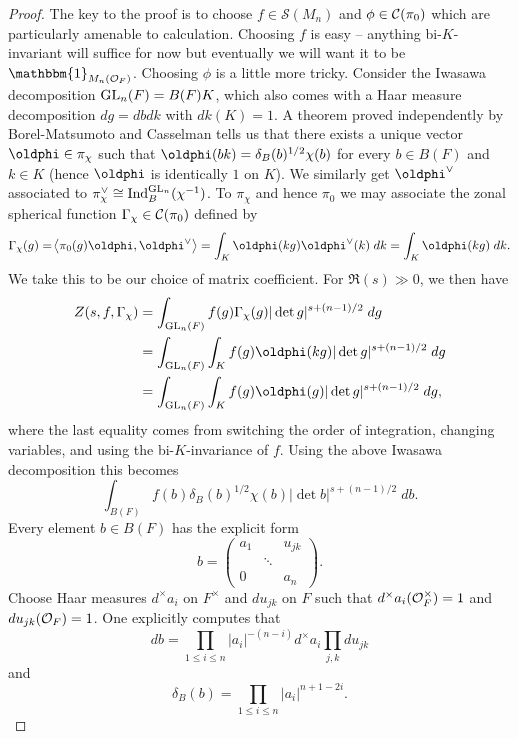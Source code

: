 \documentclass[11pt]{article}
\newcommand{\Ind}{\textup{Ind}} %
\newcommand{\ind}{\mathbbm{1}}
\renewcommand{\S}{\mathscr{S}}
\begin{document}
\begin{proof}
The key to the proof is to choose $f\in\S(M_n)$ and $\phi\in\mathcal{C}(\pi_0)$ which are particularly amenable to calculation. Choosing $f$ is easy -- anything bi-$K$-invariant will suffice for now but eventually we will want it to be $\ind_{M_n(\O_F)}$. Choosing $\phi$ is a little more tricky. Consider the Iwasawa decomposition $\textup{GL}_n(F)=B(F)K$, which also comes with a Haar measure decomposition $dg=dbdk$ with $dk(K)=1$. A theorem proved independently by Borel-Matsumoto and Casselman tells us that there exists a unique vector $\oldphi\in\pi_{\chi}$ such that $\oldphi(bk)=\delta_B(b)^{1/2}\chi(b)$ for every $b\in B(F)$ and $k\in K$ (hence $\oldphi$ is identically $1$ on $K$). We similarly get $\oldphi^{\vee}$ associated to $\pi_{\chi}^{\vee}\iso\Ind_B^{\GL_n}(\chi^{-1})$. To $\pi_{\chi}$ and hence $\pi_0$ we may associate the zonal spherical function $\Gamma_{\chi}\in\mathcal{C}(\pi_0)$ defined by 
\begin{align*}
\Gamma_{\chi}(g)
=\ip{\pi_0(g)\oldphi,\oldphi^{\vee}}
=\int_K\oldphi(kg)\oldphi^{\vee}(k)\;dk
=\int_K\oldphi(kg)\;dk.
\end{align*}
We take this to be our choice of matrix coefficient. For $\Re(s)\gg0$, we then have
\begin{align*}
Z(s,f,\Gamma_{\chi})
&=\int_{\GL_n(F)}f(g)\Gamma_{\chi}(g)|\det g|^{s+(n-1)/2}\;dg \\
&=\int_{\GL_n(F)}\int_Kf(g)\oldphi(kg)|\det g|^{s+(n-1)/2}\;dg \\
&=\int_{\GL_n(F)}\int_Kf(g)\oldphi(g)|\det g|^{s+(n-1)/2}\;dg,
\end{align*}
where the last equality comes from switching the order of integration, changing variables, and using the bi-$K$-invariance of $f$. Using the above Iwasawa decomposition this becomes 
$$\int_{B(F)}f(b)\delta_B(b)^{1/2}\chi(b)|\det b|^{s+(n-1)/2}\;db.$$
Every element $b\in B(F)$ has the explicit form
\begin{equation*}
b=
\begin{pmatrix}
a_1 & & u_{jk} \\
& \ddots & \\
0 & & a_n
\end{pmatrix}.
\end{equation*}
Choose Haar measures $d^{\times}a_i$ on $F^{\times}$ and $du_{jk}$ on $F$ such that $d^{\times}a_i(\mathcal{O}_F^{\times})=1$ and $du_{jk}(\mathcal{O}_F)=1$. One explicitly computes that 
$$db=\prod_{1\leq i\leq n}|a_i|^{-(n-i)}d^{\times}a_i\prod_{j,k}du_{jk}$$
and
$$\delta_B(b)=\prod_{1\leq i\leq n}|a_i|^{n+1-2i}.$$

\end{proof}
\end{document}
